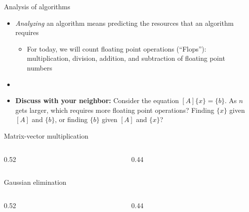 \documentclass[aspectratio=169]{beamer}
\begin{document}
\begin{frame}{Analysis of algorithms}
  \begin{itemize}
    \item \emph{Analyzing} an algorithm means predicting the resources that
      an algorithm requires
      \begin{itemize}
        \item For today, we will count floating point operations
          (``Flops''): multiplication, division, addition, and subtraction
          of floating point numbers
      \end{itemize}
    \item[]
        \pause
    \item \textbf{Discuss with your neighbor:} Consider the equation
      $[A]\{x\} = \{b\}$. As $n$ gets larger, which requires more floating
      point operations? Finding $\{x\}$ given $[A]$ and $\{b\}$, or finding
      $\{b\}$ given $[A]$ and $\{x\}$?
  \end{itemize}
\end{frame}

\begin{frame}{Matrix-vector multiplication}
  \begin{columns}[T]
    \begin{column}{0.52\textwidth}
      {\small}
    \end{column}
    \begin{column}{0.44\textwidth}
    \end{column}
  \end{columns}
\end{frame}

\begin{frame}{Gaussian elimination}
  \begin{columns}[T]
    \begin{column}{0.52\textwidth}
      {\scriptsize}
    \end{column}
    \begin{column}{0.44\textwidth}
    \end{column}
  \end{columns}
\end{frame}
\end{document}

